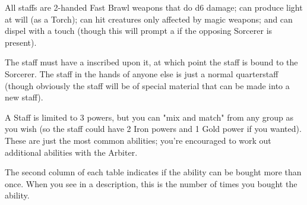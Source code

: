 {All staffs are 2-handed Fast Brawl weapons that do d6 damage; can produce light at will (as a Torch); can hit creatures only affected by magic weapons; and can dispel  with a touch (though this will  prompt a  if the opposing Sorcerer is present).

The staff must have a  inscribed upon it, at which point the staff is bound to the Sorcerer. The staff in the hands of anyone else is just a normal quarterstaff (though obviously the staff will be of special material that can be made into a new staff). 

A Staff is limited to 3 powers, but you can "mix and match" from any group as you wish (so the staff could have 2 Iron powers and 1 Gold power if you wanted). These are just the most common abilities; you're encouraged to work out additional abilities with the Arbiter.

The second column of each table indicates if the ability can be bought more than once.  When you see \mybold{[num]} in a description, this is the number of times you bought the ability.

\cbreak











}

